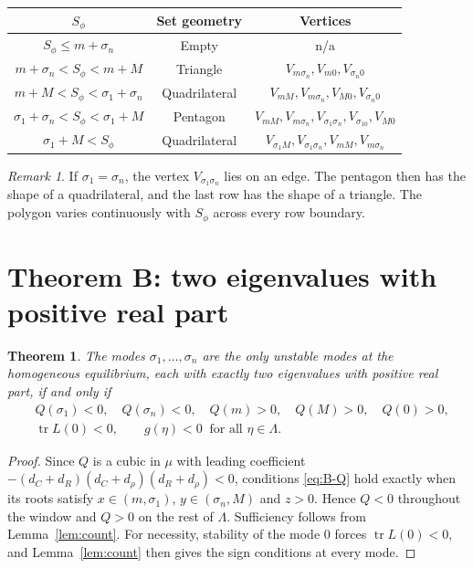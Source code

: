 \documentclass[11pt]{article}
\newtheorem{theorem}{Theorem}
\theoremstyle{remark}
\newtheorem{remark}{Remark}
\begin{document}
\begin{center}
\renewcommand{\arraystretch}{1.25}
\begin{tabular}{|c|c|c|}
\hline
$S_\phi$ & Set geometry & Vertices \\
\hline
$S_\phi\le m+\sigma_n$ & Empty & n/a \\
\hline
$m+\sigma_n<S_\phi<m+M$ & Triangle & $V_{m\sigma_n},V_{m0},V_{\sigma_n0}$ \\
\hline
$m+M<S_\phi<\sigma_1+\sigma_n$ & Quadrilateral & $V_{mM},V_{m\sigma_n},V_{M0},V_{\sigma_n0}$ \\
\hline
$\sigma_1+\sigma_n<S_\phi<\sigma_1+M$ & Pentagon & $V_{mM},V_{m\sigma_n},V_{\sigma_1\sigma_n},V_{\sigma_10},V_{M0}$ \\
\hline
$\sigma_1+M<S_\phi$ & Quadrilateral & $V_{\sigma_1M},V_{\sigma_1\sigma_n},V_{mM},V_{m\sigma_n}$ \\
\hline
\end{tabular}
\end{center}

\begin{remark}
If $\sigma_1=\sigma_n$, the vertex $V_{\sigma_1\sigma_n}$ lies on an edge. The pentagon then has the shape of a quadrilateral, and the last row has the shape of a triangle. The polygon varies continuously with $S_\phi$ across every row boundary.
\end{remark}

\section{Theorem B: two eigenvalues with positive real part}

\begin{theorem}\label{thm:B}
The modes $\sigma_1,\dots,\sigma_n$ are the only unstable modes at the homogeneous equilibrium, each with exactly two eigenvalues with positive real part, if and only if
\begin{align}
&Q(\sigma_1)<0,\quad Q(\sigma_n)<0,\quad Q(m)>0,\quad Q(M)>0,\quad Q(0)>0, \label{eq:B-Q}\\
&\operatorname{tr}L(0)<0,\qquad g(\eta)<0\ \text{ for all }\eta\in\Lambda. \label{eq:B-g}
\end{align}
\end{theorem}

\begin{proof}
Since $Q$ is a cubic in $\mu$ with leading coefficient $-(d_C+d_R)(d_C+d_\rho)(d_R+d_\rho)<0$, conditions \eqref{eq:B-Q} hold exactly when its roots satisfy $x\in(m,\sigma_1)$, $y\in(\sigma_n,M)$ and $z>0$. Hence $Q<0$ throughout the window and $Q>0$ on the rest of $\Lambda$. Sufficiency follows from Lemma~\ref{lem:count}. For necessity, stability of the mode $0$ forces $\operatorname{tr}L(0)<0$, and Lemma~\ref{lem:count} then gives the sign conditions at every mode.
\end{proof}
\end{document}
